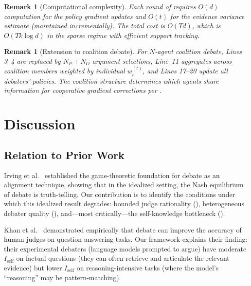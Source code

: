 \documentclass[11pt,a4paper]{article}
\newtheorem{remark}[theorem]{Remark}
\begin{document}
\begin{remark}[Computational complexity]
Each round of  requires $O(d)$ computation for the
policy gradient updates and $O(t)$ for the evidence variance estimate
(maintained incrementally). The total cost is $O(Td)$, which is
$O(Tk\log d)$ in the sparse regime with efficient support tracking.
\end{remark}

\begin{remark}[Extension to coalition debate]
For $N$-agent coalition debate, Lines 3--4 are replaced by $N_P + N_O$
argument selections, Line~11 aggregates across coalition members
weighted by individual $w_i^{(t)}$, and Lines 17--20 update all
debaters' policies. The coalition structure determines which agents
share information for cooperative gradient corrections per
\cite{shcherbinin2026coop}.
\end{remark}

\section{Discussion}
\label{sec:discussion}

\subsection{Relation to Prior Work}

Irving et al.\ \cite{irving2018} established the game-theoretic foundation
for debate as an alignment technique, showing that in the idealized
setting, the Nash equilibrium of debate is truth-telling. Our
contribution is to identify the conditions under which this idealized
result degrades: bounded judge rationality (),
heterogeneous debater quality (), and---most
critically---the self-knowledge bottleneck ().

Khan et al.\ \cite{khan2024} demonstrated empirically that debate can
improve the accuracy of human judges on question-answering tasks.
Our framework explains their finding: their experimental debaters
(language models prompted to argue) have moderate $I_{\text{self}}$
on factual questions (they can often retrieve and articulate the
relevant evidence) but lower $I_{\text{self}}$ on reasoning-intensive
tasks (where the model's ``reasoning'' may be pattern-matching).
\end{document}
